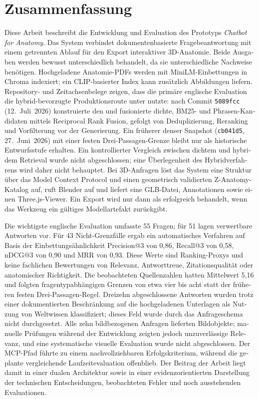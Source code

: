 \chapter*{Zusammenfassung}

\begin{otherlanguage}{ngerman}
Diese Arbeit beschreibt die Entwicklung und Evaluation des Prototyps \emph{Chatbot for Anatomy}. Das System verbindet dokumentenbasierte Fragebeantwortung mit einem getrennten Ablauf für den Export interaktiver 3D-Anatomie. Beide Ausgaben werden bewusst unterschiedlich behandelt, da sie unterschiedliche Nachweise benötigen. Hochgeladene Anatomie-PDFs werden mit MiniLM-Einbettungen in Chroma indexiert; ein CLIP-basierter Index kann zusätzlich Abbildungen liefern. Repository- und Zeitachsenbelege zeigen, dass die primäre englische Evaluation die hybrid-bevorzugte Produktionsroute unter  nutzte: nach Commit \texttt{5089fcc} (12.~Juli~2026) konstruierte  den  und fusionierte dichte, BM25- und Phrasen-Kandidaten mittels Reciprocal Rank Fusion, gefolgt von Deduplizierung, Reranking und Vorfilterung vor der Generierung. Ein früherer denser Snapshot (\texttt{cb041d5}, 27.~Juni~2026) mit einer festen Drei-Passagen-Grenze bleibt nur als historische Entwurfsstufe erhalten. Ein kontrollierter Vergleich zwischen dichtem und hybridem Retrieval wurde nicht abgeschlossen; eine Überlegenheit des Hybridverfahrens wird daher nicht behauptet. Bei 3D-Anfragen löst das System eine Struktur über das Model Context Protocol und einen geometrisch validierten Z-Anatomy-Katalog auf, ruft Blender auf und liefert eine GLB-Datei, Annotationen sowie einen Three.js-Viewer. Ein Export wird nur dann als erfolgreich behandelt, wenn das Werkzeug ein gültiges Modellartefakt zurückgibt.

Die wichtigste englische Evaluation umfasste 55 Fragen; für 51 lagen verwertbare Antworten vor. Für 43 Nicht-Grenzfälle ergab ein automatisches Verfahren auf Basis der Einbettungsähnlichkeit Precision@3 von 0{,}86, Recall@3 von 0{,}58, nDCG@3 von 0{,}90 und MRR von 0{,}93. Diese Werte sind Ranking-Proxys und keine fachlichen Bewertungen von Relevanz, Antworttreue, Zitationsqualität oder anatomischer Richtigkeit. Die beobachteten Quellenzahlen hatten Mittelwert 5{,}16 und folgten fragentypabhängigen Grenzen von etwa vier bis acht statt der früheren festen Drei-Passagen-Regel. Dreizehn abgeschlossene Antworten wurden trotz einer dokumentierten Beschränkung auf die hochgeladenen Unterlagen als Nutzung von Weltwissen klassifiziert; dieses Feld wurde durch das Anfrageschema nicht durchgesetzt. Alle zehn bildbezogenen Anfragen lieferten Bildobjekte; manuelle Prüfungen während der Entwicklung zeigten jedoch unzuverlässige Relevanz, und eine systematische visuelle Evaluation wurde nicht abgeschlossen. Der MCP-Pfad führte zu einem nachvollziehbaren Erfolgskriterium, während die geplante vergleichende Laufzeitevaluation offenblieb. Der Beitrag der Arbeit liegt damit in einer dualen Architektur sowie in einer evidenzorientierten Darstellung der technischen Entscheidungen, beobachteten Fehler und noch ausstehenden Evaluationen.
\end{otherlanguage}

\cleardoublepage
